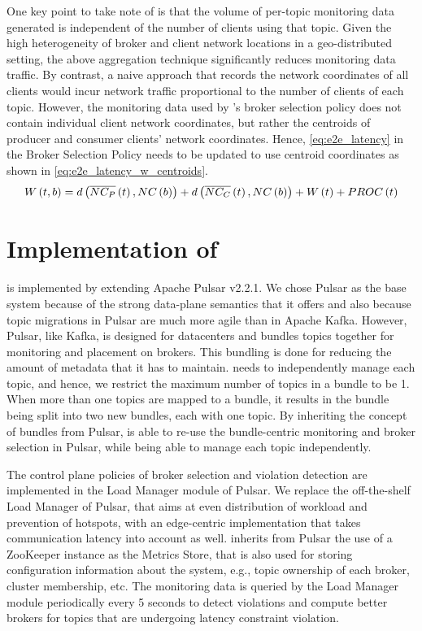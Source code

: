 \par One key point to take note of is that the volume of per-topic monitoring data generated is independent of the number of clients using that topic. Given the high heterogeneity of broker and client network locations in a geo-distributed setting, the above aggregation technique significantly reduces monitoring data traffic. By contrast, a naive approach that records the network coordinates of all clients would incur network traffic proportional to the number of clients of each topic. However, the monitoring data used by \epulsar{}'s broker selection policy does not contain individual client network coordinates, but rather the centroids of producer and consumer clients' network coordinates. Hence, \cref{eq:e2e_latency} in the Broker Selection Policy needs to be updated to use centroid coordinates as shown in \cref{eq:e2e_latency_w_centroids}.
\begin{equation}
\label{eq:e2e_latency_w_centroids}
W \left( t, b\right) = d \left( \overline{NC_P} \left( t \right), NC \left( b \right) \right) + d \left( \overline{NC_C} \left( t \right), NC \left( b \right) \right) + W \left( t \right) + PROC \left( t \right)
\vspace{-0.05in}
\end{equation}

\section{Implementation of \epulsar{}}
\label{sec:epulsar_impl}
\epulsar{} is implemented by extending Apache Pulsar v2.2.1. We chose Pulsar as the base system because of the strong data-plane semantics that it offers and also because topic migrations in Pulsar are much more agile than in Apache Kafka. However, Pulsar, like Kafka, is designed for datacenters and bundles topics together for monitoring and placement on brokers. This bundling is done for reducing the amount of metadata that it has to maintain. \epulsar{} needs to independently manage each topic, and hence, we restrict the maximum number of topics in a bundle to be 1. When more than one topics are mapped to a bundle, it results in the bundle being split into two new bundles, each with one topic. By inheriting the concept of bundles from Pulsar, \epulsar{} is able to re-use the bundle-centric monitoring and broker selection in Pulsar, while being able to manage each topic independently.
\par The control plane policies of broker selection and violation detection are implemented in the Load Manager module of Pulsar. We replace the off-the-shelf Load Manager of Pulsar, that aims at even distribution of workload and prevention of hotspots, with an edge-centric implementation that takes communication latency into account as well. \epulsar{} inherits from Pulsar the use of a ZooKeeper instance as the Metrics Store, that is also used for storing configuration information about the system, e.g., topic ownership of each broker, cluster membership, etc. The monitoring data is queried by the Load Manager module periodically every 5 seconds to detect violations and compute better brokers for topics that are undergoing latency constraint violation.

